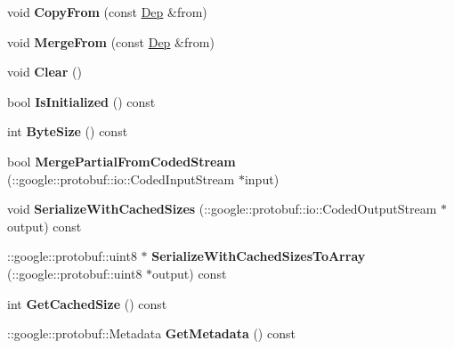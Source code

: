\begin{DoxyCompactItemize}
\item 
\hypertarget{classDep_a9c5e702a5cafd5a8bdf72ef36d754d27}{
void {\bfseries CopyFrom} (const \hyperlink{classDep}{Dep} \&from)}
\label{classDep_a9c5e702a5cafd5a8bdf72ef36d754d27}

\item 
\hypertarget{classDep_ad104b852e4e4e46eaa50d376b19fe83d}{
void {\bfseries MergeFrom} (const \hyperlink{classDep}{Dep} \&from)}
\label{classDep_ad104b852e4e4e46eaa50d376b19fe83d}

\item 
\hypertarget{classDep_a1713906a00ff37953c363bdbc07cbd54}{
void {\bfseries Clear} ()}
\label{classDep_a1713906a00ff37953c363bdbc07cbd54}

\item 
\hypertarget{classDep_ae39f86aae19b958824fd94b0092e07c9}{
bool {\bfseries IsInitialized} () const }
\label{classDep_ae39f86aae19b958824fd94b0092e07c9}

\item 
\hypertarget{classDep_af27fc8c7ab40a5ad63e3908db600fc5c}{
int {\bfseries ByteSize} () const }
\label{classDep_af27fc8c7ab40a5ad63e3908db600fc5c}

\item 
\hypertarget{classDep_a2080b72b2b01ff368d85506bfc311e28}{
bool {\bfseries MergePartialFromCodedStream} (::google::protobuf::io::CodedInputStream $\ast$input)}
\label{classDep_a2080b72b2b01ff368d85506bfc311e28}

\item 
\hypertarget{classDep_a1c5ffae565cd93485ba1b7de07678efc}{
void {\bfseries SerializeWithCachedSizes} (::google::protobuf::io::CodedOutputStream $\ast$output) const }
\label{classDep_a1c5ffae565cd93485ba1b7de07678efc}

\item 
\hypertarget{classDep_a7085fcc2588e12bc51d92f37682bba3b}{
::google::protobuf::uint8 $\ast$ {\bfseries SerializeWithCachedSizesToArray} (::google::protobuf::uint8 $\ast$output) const }
\label{classDep_a7085fcc2588e12bc51d92f37682bba3b}

\item 
\hypertarget{classDep_a0574f835da4e18501475c30e0b38ba20}{
int {\bfseries GetCachedSize} () const }
\label{classDep_a0574f835da4e18501475c30e0b38ba20}

\item 
\hypertarget{classDep_a4385e73adda64a977bae6d3304cd2a66}{
::google::protobuf::Metadata {\bfseries GetMetadata} () const }
\label{classDep_a4385e73adda64a977bae6d3304cd2a66}


\end{DoxyCompactItemize}
